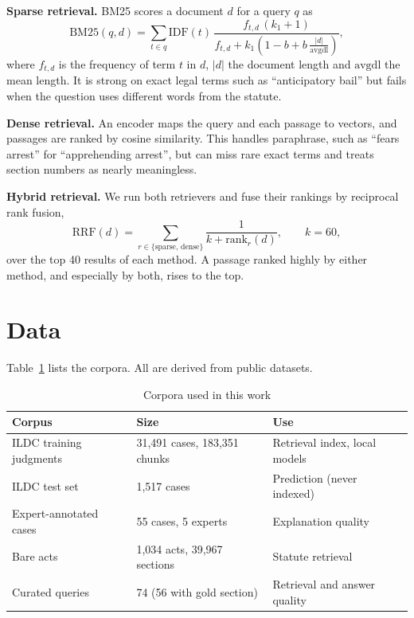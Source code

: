 \documentclass[conference]{IEEEtran}
\begin{document}
\textbf{Sparse retrieval.} BM25 scores a document $d$ for a query $q$ as
\begin{equation}
\mathrm{BM25}(q,d)=\sum_{t\in q}\mathrm{IDF}(t)\,\frac{f_{t,d}\,(k_1+1)}{f_{t,d}+k_1\!\left(1-b+b\,\frac{|d|}{\mathrm{avgdl}}\right)},
\end{equation}
where $f_{t,d}$ is the frequency of term $t$ in $d$, $|d|$ the document length and $\mathrm{avgdl}$ the mean length. It is strong on exact legal terms such as ``anticipatory bail'' but fails when the question uses different words from the statute.

\textbf{Dense retrieval.} An encoder maps the query and each passage to vectors, and passages are ranked by cosine similarity. This handles paraphrase, such as ``fears arrest'' for ``apprehending arrest'', but can miss rare exact terms and treats section numbers as nearly meaningless.

\textbf{Hybrid retrieval.} We run both retrievers and fuse their rankings by reciprocal rank fusion,
\begin{equation}
\mathrm{RRF}(d)=\sum_{r\in\{\text{sparse},\,\text{dense}\}}\frac{1}{k+\mathrm{rank}_r(d)},\qquad k=60,
\end{equation}
over the top 40 results of each method. A passage ranked highly by either method, and especially by both, rises to the top.

\section{Data}
Table~\ref{tab:data} lists the corpora. All are derived from public datasets.

\begin{table}[t]
\caption{Corpora used in this work}
\label{tab:data}
\centering
\begin{tabular}{@{}p{3.6cm}p{2.1cm}p{2.0cm}@{}}
\toprule
Corpus & Size & Use \\
\midrule
ILDC training judgments & 31,491 cases, 183,351 chunks & Retrieval index, local models \\
ILDC test set & 1,517 cases & Prediction (never indexed) \\
Expert-annotated cases & 55 cases, 5 experts & Explanation quality \\
Bare acts & 1,034 acts, 39,967 sections & Statute retrieval \\
Curated queries & 74 (56 with gold section) & Retrieval and answer quality \\
\bottomrule
\end{tabular}
\end{table}
\end{document}

